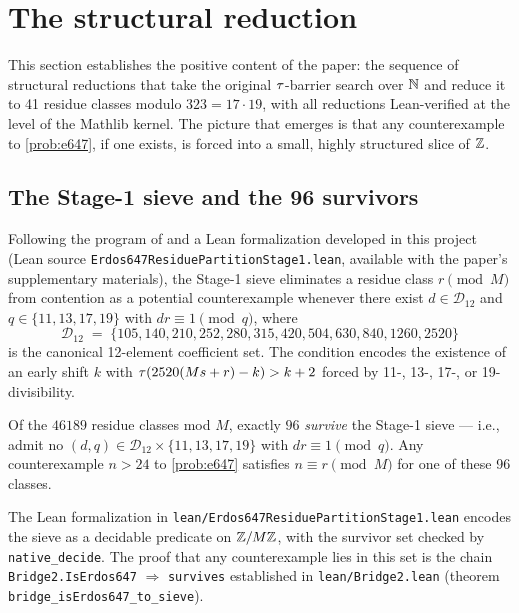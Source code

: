 
\section{The structural reduction}
\label{sec:structural-reduction}

This section establishes the positive content of the paper: the
sequence of structural reductions that take the original
$\tau$-barrier search over $\mathbb{N}$ and reduce it to 41 residue classes
modulo $323 = 17 \cdot 19$, with all reductions Lean-verified at the
level of the Mathlib kernel. The picture that emerges is that any
counterexample to \cref{prob:e647}, if one exists, is forced into a
small, highly structured slice of $\mathbb{Z}$.

\subsection{The Stage-1 sieve and the 96 survivors}
\label{sec:stage1-sieve}

Following the program of \cite{ErdosGraham1980} and a Lean
formalization developed in this project (Lean source
\texttt{Erdos647ResiduePartitionStage1.lean}, available with the paper's
supplementary materials), the Stage-1 sieve eliminates a residue
class $r \pmod M$ from
contention as a potential counterexample whenever there exist
$d \in \mathcal{D}_{12}$ and $q \in \{11, 13, 17, 19\}$ with
$d r \equiv 1 \pmod q$, where
\[
\mathcal{D}_{12} \;=\; \{105, 140, 210, 252, 280, 315, 420, 504, 630,
840, 1260, 2520\}
\]
is the canonical 12-element coefficient set. The condition encodes
the existence of an early shift $k$ with $\tau(2520(Ms + r) - k) > k+2$
forced by 11-, 13-, 17-, or 19-divisibility.

\begin{theorem}
\label{thm:stage1-restated}
Of the $46189$ residue classes mod $M$, exactly $96$ \emph{survive}
the Stage-1 sieve --- i.e., admit no $(d, q) \in \mathcal{D}_{12}
\times \{11, 13, 17, 19\}$ with $d r \equiv 1 \pmod q$. Any
counterexample $n > 24$ to \cref{prob:e647} satisfies $n \equiv r
\pmod M$ for one of these 96 classes.
\end{theorem}

The Lean formalization in
\texttt{lean/Erdos647ResiduePartitionStage1.lean} encodes the sieve
as a decidable predicate on $\mathbb{Z} / M\mathbb{Z}$, with the survivor set
checked by \texttt{native\_decide}. The proof that any
counterexample lies in this set is the chain
\texttt{Bridge2.IsErdos647} $\Rightarrow$ \texttt{survives}
established in \texttt{lean/Bridge2.lean} (theorem
\texttt{bridge\_isErdos647\_to\_sieve}).

